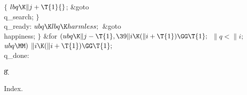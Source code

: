 ${}\{{}$\1\6
${}\\{lbq}\K\|j+\T{1}{}$;\5
\&{goto} \\{q\_search};\6
\4${}\}{}$\2\6
\4\\{q\_ready}:\5
${}\\{ubq}\K\\{lbq}\K\\{harmless};{}$\6
\&{goto} \\{happiness};\6
\4${}\}{}$\2\6
\&{for} ${}(\\{ubq}\K\|j-\T{1},\39\|i\K(\|i+\T{1})\GG\T{1};{}$ ${}\|q<\|i;{}$
${}\\{ubq}\MM){}$\1\5
${}\|i\K(\|i+\T{1})\GG\T{1};{}$\2\6
\4\\{q\_done}:\par
\U8.\fi

Index.


\fi


\inx
\fin
\con
